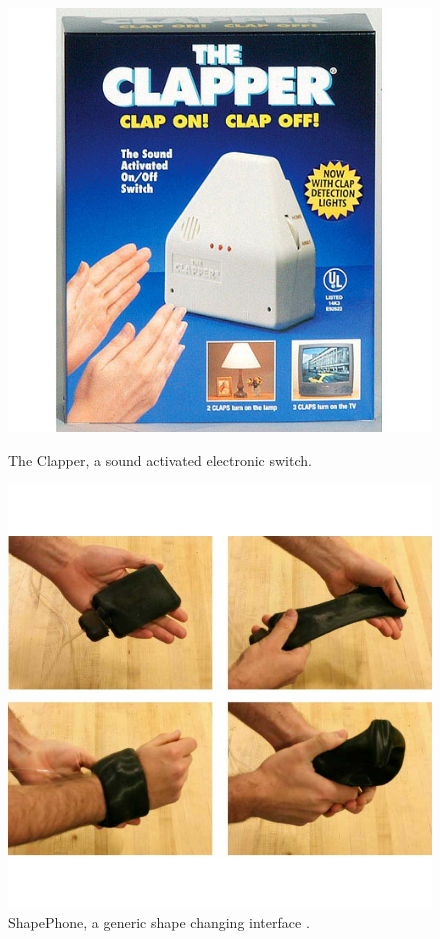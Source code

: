 \begin{figure}[h]
	\centering
	\begin{minipage}[b]{.44\textwidth}
		\centering
		\includegraphics[width=\linewidth]{figures/theclapper}
		\caption{The Clapper, a sound activated electronic switch.}
		\label{fig:ch:adhoc:theclapper}
	\end{minipage}
	\hspace{0.02\textwidth}
	\begin{minipage}[b]{.44\textwidth}
		\centering
		\includegraphics[width=\linewidth]{figures/shapephone}
		\caption{ShapePhone, a generic shape changing interface \citep{follmer2012jamming}.}
		\label{fig:ch:adhoc:shapephone}
	\end{minipage}
\end{figure}

